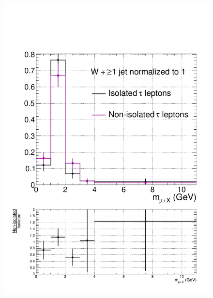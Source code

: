 \begin{figure}[hbtp]
\begin{center}
    \includegraphics[width=0.8\cmsFigWidth]{figures/isoVsNonIsoTaus_WNJets_highMT_v87}

\end{center}
\end{figure}
